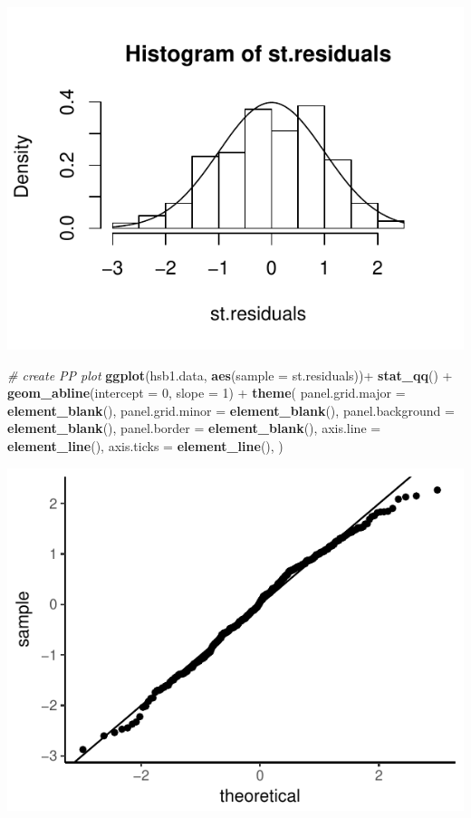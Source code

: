 \documentclass[]{article}
\newenvironment{Shaded}{\begin{snugshade}}{\end{snugshade}}
\newcommand{\KeywordTok}[1]{\textcolor[rgb]{0.13,0.29,0.53}{\textbf{{#1}}}}
\newcommand{\DataTypeTok}[1]{\textcolor[rgb]{0.13,0.29,0.53}{{#1}}}
\newcommand{\DecValTok}[1]{\textcolor[rgb]{0.00,0.00,0.81}{{#1}}}
\newcommand{\StringTok}[1]{\textcolor[rgb]{0.31,0.60,0.02}{{#1}}}
\newcommand{\CommentTok}[1]{\textcolor[rgb]{0.56,0.35,0.01}{\textit{{#1}}}}
\newcommand{\NormalTok}[1]{{#1}}
\begin{document}
\includegraphics{Homework_3_Revised_Minoo_files/figure-latex/unnamed-chunk-4-5.pdf}

\begin{Shaded}
\begin{Highlighting}[]
\CommentTok{# create PP plot}
\KeywordTok{ggplot}\NormalTok{(hsb1.data, }\KeywordTok{aes}\NormalTok{(}\DataTypeTok{sample =} \NormalTok{st.residuals))+}\StringTok{ }\KeywordTok{stat_qq}\NormalTok{() +}\StringTok{ }\KeywordTok{geom_abline}\NormalTok{(}\DataTypeTok{intercept =} \DecValTok{0}\NormalTok{, }\DataTypeTok{slope =} \DecValTok{1}\NormalTok{) +}
\StringTok{   }\KeywordTok{theme}\NormalTok{(}
        \DataTypeTok{panel.grid.major =} \KeywordTok{element_blank}\NormalTok{(),}
        \DataTypeTok{panel.grid.minor =} \KeywordTok{element_blank}\NormalTok{(),}
        \DataTypeTok{panel.background =} \KeywordTok{element_blank}\NormalTok{(),}
        \DataTypeTok{panel.border =} \KeywordTok{element_blank}\NormalTok{(),}
        \DataTypeTok{axis.line =} \KeywordTok{element_line}\NormalTok{(),}
        \DataTypeTok{axis.ticks =} \KeywordTok{element_line}\NormalTok{(),}
     \NormalTok{)}
\end{Highlighting}
\end{Shaded}

\includegraphics{Homework_3_Revised_Minoo_files/figure-latex/unnamed-chunk-4-6.pdf}
\end{document}
